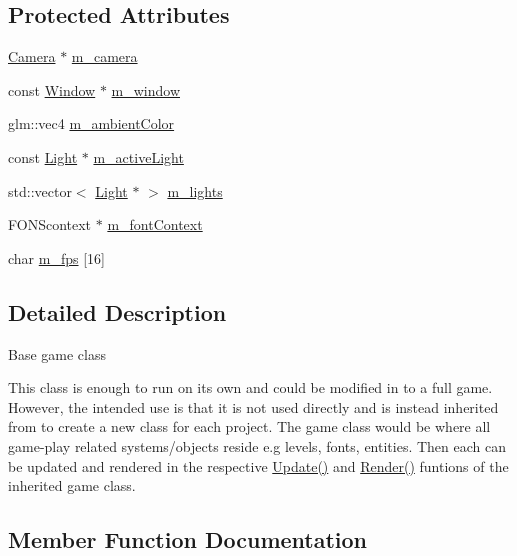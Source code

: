 \subsection*{Protected Attributes}
\begin{DoxyCompactItemize}
\item 
\hyperlink{class_z_e_g_l_1_1_camera}{Camera} $\ast$ \hyperlink{class_z_e_g_l_1_1_game_a75bf1aabc1dc5ad273611618c3ee05cf}{m\+\_\+camera}
\item 
const \hyperlink{class_z_e_g_l_1_1_window}{Window} $\ast$ \hyperlink{class_z_e_g_l_1_1_game_a72107b2460cfd896337dab847801fc1c}{m\+\_\+window}
\item 
glm\+::vec4 \hyperlink{class_z_e_g_l_1_1_game_a79bbd0830a4ac01cc820ba5a9bd26cd6}{m\+\_\+ambient\+Color}
\item 
const \hyperlink{class_z_e_g_l_1_1_light}{Light} $\ast$ \hyperlink{class_z_e_g_l_1_1_game_aa8ac2fd79809c3ad3477a4d723a7ae10}{m\+\_\+active\+Light}
\item 
std\+::vector$<$ \hyperlink{class_z_e_g_l_1_1_light}{Light} $\ast$ $>$ \hyperlink{class_z_e_g_l_1_1_game_ab301928901efd034fe40d53cdb54caf5}{m\+\_\+lights}
\item 
F\+O\+N\+Scontext $\ast$ \hyperlink{class_z_e_g_l_1_1_game_ab7239deb1a14053ae2d757994f2211d0}{m\+\_\+font\+Context}
\item 
char \hyperlink{class_z_e_g_l_1_1_game_ab290dd46ec4ff766bd56d0e3013bace1}{m\+\_\+fps} \mbox{[}16\mbox{]}
\end{DoxyCompactItemize}


\subsection{Detailed Description}
Base game class

This class is enough to run on its own and could be modified in to a full game. However, the intended use is that it is not used directly and is instead inherited from to create a new class for each project. The game class would be where all game-\/play related systems/objects reside e.\+g levels, fonts, entities. Then each can be updated and rendered in the respective \hyperlink{class_z_e_g_l_1_1_game_a6ad207394e4ce91f909d49c87802da08}{Update()} and \hyperlink{class_z_e_g_l_1_1_game_a0897730fc9fed789f6c0f11d21a0c14a}{Render()} funtions of the inherited game class. 

\subsection{Member Function Documentation}
\hypertarget{class_z_e_g_l_1_1_game_a82f5be49774c3ad1a96daac71eb0ddec}{}
